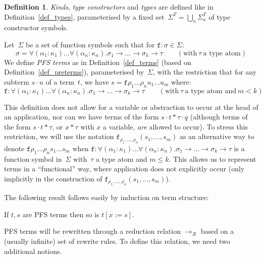 \documentclass[a4paper,UKenglish,cleveref,autoref,numberwithinsect]{lipics-v2019}
\theoremstyle{definition}
\newtheorem{defn}[theorem]{Definition}
\newcommand{\Rules}{\mathcal{R}}
\newcommand{\arrtype}{\rightarrow}
\newcommand{\app}[2]{#1 \cdot #2}
\newcommand{\subst}[2]{#1:=#2}
\newcommand{\arr}[1]{\longrightarrow_{#1}}
\begin{document}
\begin{defn}\label{def_pafs_types_terms}
  \emph{Kinds}, \emph{type constructors} and \emph{types} are defined
  like in Definition~\ref{def_types}, parameterised by a fixed
  set~$\Sigma^T = \bigcup_{\kappa}\Sigma^T_\kappa$ of type constructor
  symbols.

  Let~$\Sigma$ be a set of function symbols such
  that for $\mathtt{f} : \sigma \in \Sigma$:
    \[
    \sigma = \forall (\alpha_1 : \kappa_1) \ldots \forall (\alpha_n : \kappa_n)
    . \sigma_1 \arrtype \ldots \arrtype \sigma_k \arrtype \tau
    \quad\quad (\text{with}\ \tau\ \text{a type atom})
    \]
    We define \emph{PFS terms} as in Definition~\ref{def_terms} (based
    on Definition~\ref{def_preterms}), parameterised by~$\Sigma$, with
    the restriction that for any subterm $\app{s}{u}$ of a term~$t$,
    we have $s = \mathtt{f} \rho_1 \ldots \rho_n u_1 \ldots u_m$
    where:
    \[
    \mathtt{f} : \forall (\alpha_1 : \kappa_1) \ldots
    \forall (\alpha_n : \kappa_n) . \sigma_1 \arrtype \ldots \arrtype
    \sigma_k \arrtype \tau
    \quad\quad (\text{with}\ \tau\ \text{a type atom and}\ m < k)
    \]
\end{defn}

This definition does not allow for a variable or
abstraction to occur at the head of an application, nor can we have
terms of the form $s \cdot t * \tau \cdot q$ (although terms of the
form $s \cdot t * \tau$, or $x * \tau$ with $x$ a variable,
\emph{are} allowed to occur).  To stress this restriction, we will
use the notation
$\mathtt{f}_{\rho_1,\ldots,\rho_n}(s_1,\ldots,s_m)$ as an alternative
way to denote
$\mathtt{f} \rho_1 \ldots \rho_n s_1 \ldots s_m$ when
$
  \mathtt{f} : \forall (\alpha_1 : \kappa_1) \ldots
  \forall (\alpha_n : \kappa_n) . \sigma_1 \arrtype \ldots \arrtype
  \sigma_k \arrtype \tau
$
is a function symbol in~$\Sigma$ with~$\tau$ a type atom and $m \leq k$.
This allows us to represent terms in a ``functional'' way, where
application does not explicitly occur (only implicitly in the
construction of $\mathtt{f}_{\rho_1,\ldots,\rho_n}(s_1,\ldots,s_m)$).

The following result follows easily by induction on term
structure:

\begin{lemma}
  If $t,s$ are PFS terms then so is $t[\subst{x}{s}]$.
\end{lemma}

PFS terms will be rewritten through a reduction relation
$\arr{\Rules}$ based on a (usually infinite) set of rewrite rules. To
define this relation, we need two additional notions.
\end{document}
